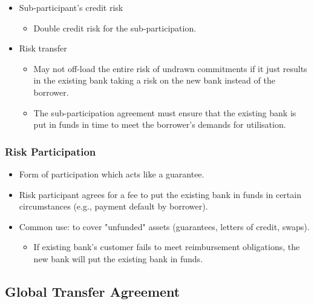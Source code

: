 \documentclass[
]{article}
\providecommand{\tightlist}{%
  \setlength{\itemsep}{0pt}\setlength{\parskip}{0pt}}
\begin{document}
\begin{itemize}
\tightlist
\item
  Sub-participant's credit risk

  \begin{itemize}
  \tightlist
  \item
    Double credit risk for the sub-participation.
  \end{itemize}
\item
  Risk transfer

  \begin{itemize}
  \tightlist
  \item
    May not off-load the entire risk of undrawn commitments if it just
    results in the existing bank taking a risk on the new bank instead
    of the borrower.
  \item
    The sub-participation agreement must ensure that the existing bank
    is put in funds in time to meet the borrower's demands for
    utilisation.
  \end{itemize}
\end{itemize}

\hypertarget{risk-participation}{%
\subsubsection{Risk Participation}\label{risk-participation}}

\begin{itemize}
\tightlist
\item
  Form of participation which acts like a guarantee.
\item
  Risk participant agrees for a fee to put the existing bank in funds in
  certain circumstances (e.g., payment default by borrower).
\item
  Common use: to cover "unfunded" assets (guarantees, letters of credit,
  swaps).

  \begin{itemize}
  \tightlist
  \item
    If existing bank's customer fails to meet reimbursement obligations,
    the new bank will put the existing bank in funds.
  \end{itemize}
\end{itemize}

\hypertarget{global-transfer-agreement}{%
\subsection{Global Transfer Agreement}\label{global-transfer-agreement}}
\end{document}
